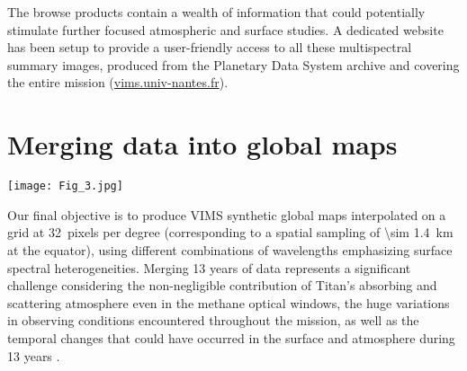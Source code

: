 \documentclass[preprint,twocolumn,5p,authoryear,compress,colorlinks=true]{elsarticle}
\begin{document}
{The browse products contain a wealth of information that could potentially stimulate further focused atmospheric and surface studies. A dedicated website has been setup to provide a user-friendly access to all these multispectral summary images, produced from the Planetary Data System archive and covering the entire mission (\href{https://vims.univ-nantes.fr/}{vims.univ-nantes.fr}).

\section{Merging data into global maps}

\begin{figure*}[!ht]
 \texttt{[image: Fig\_3.jpg]}
 \caption{Raw global mosaics in equidistant cylindrical projection at \num{1.08}, \num{2.03}, \SI{5}{\um} (surface windows) and \SI{1.95}{\um} (atmosphere only) compared to global mosaics of incidence, emergence, phase, and airmass, containing all the VIMS cubes acquired during the entire Cassini mission, within the data filters described in the text. The observing conditions vary widely during the mission, which causes significant seams or boundaries to appear in the uncorrected mosaics. The white dashed rectangle on the \SI{5}{\um} map corresponds to the test area used to determine the corrections.}
 \label{fig:fig_3}
\end{figure*}

Our final objective is to produce VIMS synthetic global maps interpolated on a grid at \SI{32}{pixels} per degree (corresponding to a spatial sampling of \SI{\sim 1.4}{km} at the equator), using different combinations of wavelengths emphasizing surface spectral heterogeneities. Merging 13 years of data represents a significant challenge considering the non-negligible contribution of Titan's absorbing and scattering atmosphere even in the methane optical windows, the huge variations in observing conditions encountered throughout the mission, as well as the temporal changes that could have occurred in the surface and atmosphere during 13 years \citep{Barnes2013b, Solomonidou2016}.

}
\end{document}
